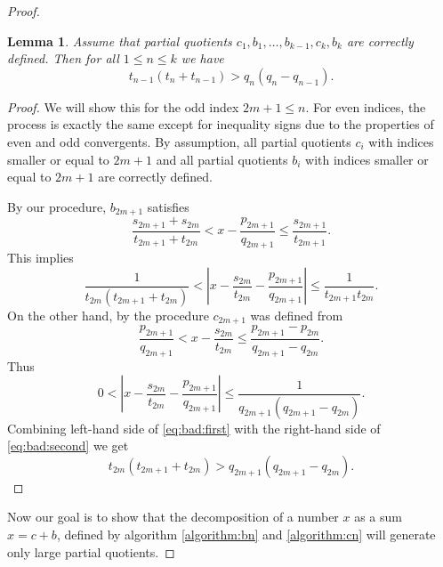 \documentclass{amsart}
\newtheorem{lemma}[theorem]{Lemma}
\theoremstyle{definition}
\newcommand{\0}{\mbf 0}%
\begin{document}
\begin{proof}
\begin{lemma}\label{lemma:quotient:tlarge}
Assume that partial quotients $c_1,b_1,\ldots,b_{k-1},c_k,b_k$ are correctly defined. Then for all $1\leq n \leq k$ we have 
\begin{equation}\label{inequality:lemma2}
t_{n-1}(t_n+t_{n-1}) > q_n(q_n - q_{n-1}).
\end{equation}
\end{lemma}
\begin{proof}
We will show this for the odd index $2m+1\leq n$. For even indices, the process is exactly the same except for inequality signs due to the properties of even and odd convergents. By assumption, all partial quotients $c_i$ with indices smaller or equal to $2m+1$ and all partial quotients $b_i$ with indices smaller or equal to $2m+1$ are correctly defined.

By our procedure, $b_{2m+1}$ satisfies
$$
\frac{s_{2m+1}+s_{2m}}{t_{2m+1}+t_{2m}}  < x - \frac{p_{2m+1}}{q_{2m+1}}   \leq \frac{s_{2m+1}}{t_{2m+1}}.
$$
This implies
\begin{equation}\label{eq:bad:first}
\frac{1}{t_{2m}(t_{2m+1}+t_{2m})}  < \left| x - \frac{s_{2m}}{t_{2m}} - \frac{p_{2m+1}}{q_{2m+1}} \right| \leq \frac{1}{t_{2m+1}t_{2m}}.
\end{equation}
On the other hand, by the procedure $c_{2m+1}$ was defined from 
$$
\frac{p_{2m+1}}{q_{2m+1}} < x- \frac{s_{2m}}{t_{2m}} \leq \frac{p_{2m+1}-p_{2m}}{q_{2m+1}-q_{2m}}.
$$
Thus
\begin{equation}\label{eq:bad:second}
0 < \left| x - \frac{s_{2m}}{t_{2m}} - \frac{p_{2m+1}}{q_{2m+1}} \right| \leq \frac{1}{q_{2m+1}(q_{2m+1}-q_{2m})}.
\end{equation}
Combining left-hand side of \eqref{eq:bad:first} with the right-hand side of \eqref{eq:bad:second} we get
$$
 t_{2m}(t_{2m+1}+t_{2m}) >q_{2m+1}(q_{2m+1}-q_{2m}) .
$$

\end{proof}



 Now our goal is to show that the decomposition of a number $x$ as a sum $x=c+b$, defined by algorithm \eqref{algorithm:bn} and \eqref{algorithm:cn} will generate only large partial quotients.


\end{proof}
\end{document}
